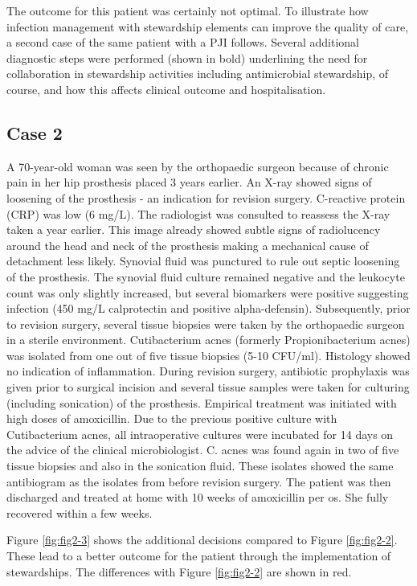 \documentclass[
]{book}
\begin{document}
The outcome for this patient was certainly not optimal. To illustrate how infection management with stewardship elements can improve the quality of care, a second case of the same patient with a PJI follows. Several additional diagnostic steps were performed (shown in bold) underlining the need for collaboration in stewardship activities including antimicrobial stewardship, of course, and how this affects clinical outcome and hospitalisation.

\hypertarget{case-2}{%
\subsection{Case 2}\label{case-2}}

A 70-year-old woman was seen by the orthopaedic surgeon because of chronic pain in her hip prosthesis placed 3 years earlier. An X-ray showed signs of loosening of the prosthesis - an indication for revision surgery. C-reactive protein (CRP) was low (6 mg/L). The radiologist was consulted to reassess the X-ray taken a year earlier. This image already showed subtle signs of radiolucency around the head and neck of the prosthesis making a mechanical cause of detachment less likely. Synovial fluid was punctured to rule out septic loosening of the prosthesis. The synovial fluid culture remained negative and the leukocyte count was only slightly increased, but several biomarkers were positive suggesting infection (450 mg/L calprotectin and positive alpha-defensin). Subsequently, prior to revision surgery, several tissue biopsies were taken by the orthopaedic surgeon in a sterile environment. Cutibacterium acnes (formerly Propionibacterium acnes) was isolated from one out of five tissue biopsies (5-10 CFU/ml). Histology showed no indication of inflammation. During revision surgery, antibiotic prophylaxis was given prior to surgical incision and several tissue samples were taken for culturing (including sonication) of the prosthesis. Empirical treatment was initiated with high doses of amoxicillin. Due to the previous positive culture with Cutibacterium acnes, all intraoperative cultures were incubated for 14 days on the advice of the clinical microbiologist. C. acnes was found again in two of five tissue biopsies and also in the sonication fluid. These isolates showed the same antibiogram as the isolates from before revision surgery. The patient was then discharged and treated at home with 10 weeks of amoxicillin per os. She fully recovered within a few weeks.

Figure \ref{fig:fig2-3} shows the additional decisions compared to Figure \ref{fig:fig2-2}. These lead to a better outcome for the patient through the implementation of stewardships. The differences with Figure \ref{fig:fig2-2} are shown in red.
\end{document}
